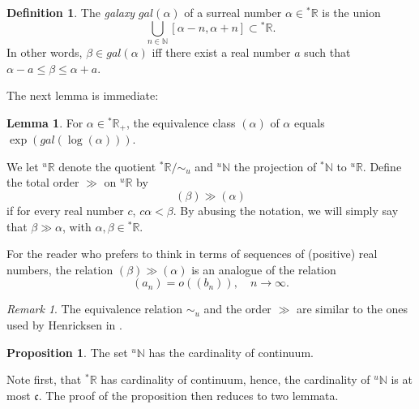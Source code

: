 \documentclass{amsproc}
\theoremstyle{definition}
\newtheorem{lemma}[theorem]{Lemma}
\theoremstyle{definition}
\newtheorem{definition}[theorem]{Definition}
\newtheorem{prop}[theorem]{Proposition}
\theoremstyle{remark}
\newtheorem{remark}[theorem]{Remark}
\begin{document}
\begin{definition}
The {\em galaxy} $gal({\alpha})$ of a surreal number ${\alpha}\in {{}^{*}{{\mathbb R}}}$ is the union
$$
\bigcup_{n\in {{\mathbb N}}} [{\alpha}-n, {\alpha}+n] \subset {{}^{*}{{\mathbb R}}}. 
$$ 
In other words, ${\beta}\in gal({\alpha})$ iff there exist a real number $a$ such that ${\alpha}-a\le {\beta} \le {\alpha}+ a$. 
\end{definition}

The next lemma is immediate:

\begin{lemma}
For ${\alpha}\in {{}^{*}{{\mathbb R}}}_+$, the equivalence class $({\alpha})$ of ${\alpha}$ equals $\exp( gal ( \log({\alpha})))$. 
\end{lemma}

We let ${{}^{u}{{\mathbb R}}}$ denote the quotient ${{}^{*}{{\mathbb R}}}/\sim_u$ and ${{}^{u}{{\mathbb N}}}$ the projection of ${{}^{*}{{\mathbb N}}}$ to ${{}^{u}{{\mathbb R}}}$. Define the total order 
$\gg$ on ${{}^{u}{{\mathbb R}}}$ by
$$
({\beta}) \gg ({\alpha})  
$$  
if for every real number $c$, $c{\alpha} < {\beta}$. By abusing the notation, we will simply say that ${\beta} \gg {\alpha}$, with ${\alpha}, {\beta}\in {{}^{*}{{\mathbb R}}}$. 

For the reader who prefers to think in terms of sequences of (positive) real numbers, 
the relation $({\beta}) \gg ({\alpha})$ is an analogue of the relation  
$$
(a_n)= o((b_n)), \quad n\to \infty. 
$$

\begin{remark}
The equivalence relation $\sim_u$ and the order $\gg$ are similar to the ones used by Henricksen in \cite{Henricksen}. \end{remark}

\begin{prop}\label{prop:un}
The set ${{}^{u}{{\mathbb N}}}$ has the cardinality of continuum. 
\end{prop}
{\par\medskip{}} Note first, that ${{}^{*}{{\mathbb R}}}$ has cardinality of continuum, hence, the cardinality of ${{}^{u}{{\mathbb N}}}$ is at most ${\mathfrak c}$. The proof of the proposition then reduces to two lemmata. 
\end{document}

